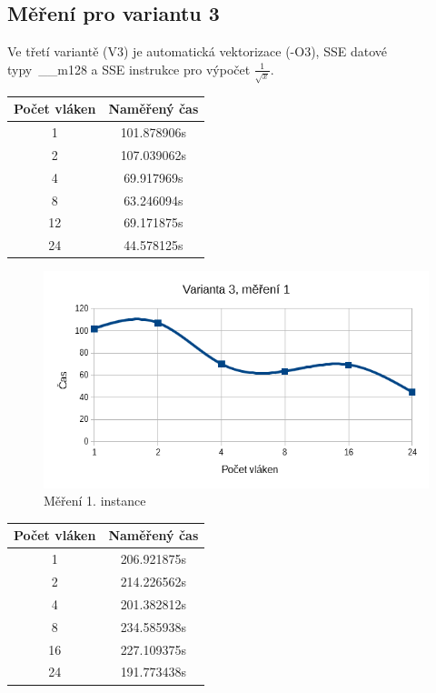 \documentclass[12pt]{article}
\begin{document}
\subsection{Měření pro variantu 3}
Ve třetí variantě (V3) je automatická vektorizace (-O3), SSE datové typy~\_\_m128 a SSE in\-struk\-ce pro výpočet ${\frac{1}{\sqrt{x}}}$.

\begin{center}
\begin{tabular}{ c | c }
\textbf{Počet vláken} & \textbf{Naměřený čas} \\ \hline \hline 
1 & 101.878906s \\ \hline
2 & 107.039062s \\ \hline
4 & 69.917969s \\ \hline
8 & 63.246094s \\ \hline
12 & 69.171875s \\ \hline
24 & 44.578125s \\ \hline
\end{tabular}
\end{center}

\begin{figure}[h]
  \begin{center}
     \includegraphics[width=12cm]{images/ssef1.png}
    \caption{Měření 1. instance} 
  \end{center}
\end{figure}

\begin{center}
\begin{tabular}{ c | c }
\textbf{Počet vláken} & \textbf{Naměřený čas} \\ \hline \hline 
1 & 206.921875s \\ \hline
2 & 214.226562s \\ \hline
4 & 201.382812s \\ \hline
8 & 234.585938s \\ \hline
16 & 227.109375s \\ \hline
24 & 191.773438s \\ \hline
\end{tabular}
\end{center}
\end{document}
